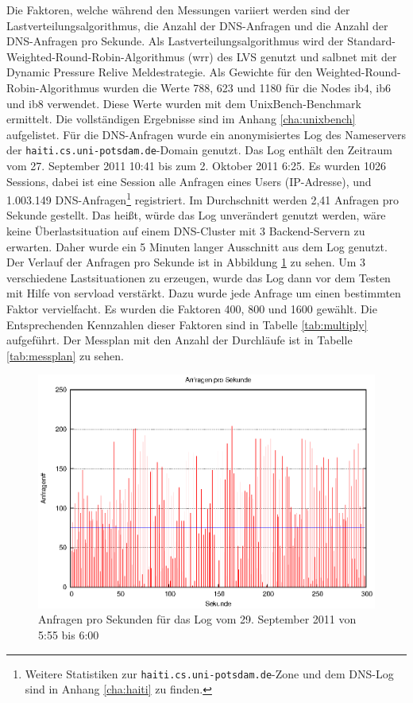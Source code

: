 \documentclass[a4paper, 12pt, BCOR10mm, DIV12, toc=bibliography, toc=listof, german]{scrbook}
\begin{document}
			Die Faktoren, welche während den Messungen variiert werden sind der
			Lastverteilungsalgorithmus, die Anzahl der DNS-Anfragen und die Anzahl der DNS-Anfragen pro
			Sekunde. Als Lastverteilungsalgorithmus wird der Standard-Weighted-Round-Robin-Algorithmus
			(wrr) des LVS genutzt und salbnet mit der Dynamic Pressure Relive Meldestrategie. Als Gewichte
			für den Weighted-Round-Robin-Algorithmus wurden die Werte 788, 623 und 1180 für die Nodes ib4,
			ib6 und ib8 verwendet. Diese Werte wurden mit dem UnixBench-Benchmark \cite{unixbench}
			ermittelt. Die vollständigen Ergebnisse sind im Anhang \ref{cha:unixbench} aufgelistet. Für
			die DNS-Anfragen wurde ein anonymisiertes Log des Nameservers der
			\texttt{haiti.cs.uni-potsdam.de}-Domain genutzt. Das Log enthält den Zeitraum vom 27.
			September 2011 10:41 bis zum 2. Oktober 2011 6:25. Es wurden 1026 Sessions, dabei ist eine
			Session alle Anfragen eines Users (IP-Adresse), und 1.003.149 DNS-Anfragen\footnote{Weitere
			Statistiken zur \texttt{haiti.cs.uni-potsdam.de}-Zone und dem DNS-Log sind in Anhang
			\ref{cha:haiti} zu finden.} registriert. Im Durchschnitt werden 2,41 Anfragen pro Sekunde
			gestellt. Das heißt, würde das Log unverändert genutzt werden, wäre keine Überlastsituation
			auf einem DNS-Cluster mit 3 Backend-Servern zu erwarten. Daher wurde ein 5 Minuten langer
			Ausschnitt aus dem Log genutzt.  Der Verlauf der Anfragen pro Sekunde ist in Abbildung
			\ref{fig:requests} zu sehen. Um 3 verschiedene Lastsituationen zu erzeugen, wurde das Log
			dann vor dem Testen mit Hilfe von servload \cite{menski2012} verstärkt. Dazu wurde jede
			Anfrage um einen bestimmten Faktor vervielfacht. Es wurden die Faktoren 400, 800 und 1600
			gewählt. Die Entsprechenden Kennzahlen dieser Faktoren sind in Tabelle \ref{tab:multiply}
			aufgeführt. Der Messplan mit den Anzahl der Durchläufe ist in Tabelle \ref{tab:messplan} zu
			sehen.


			\begin{figure}
				\centering
				\includegraphics[width=\textwidth]{plots/requests}
				\caption{Anfragen pro Sekunden für das Log vom 29. September 2011 von 5:55 bis 6:00}
				\label{fig:requests}
			\end{figure}
\end{document}
